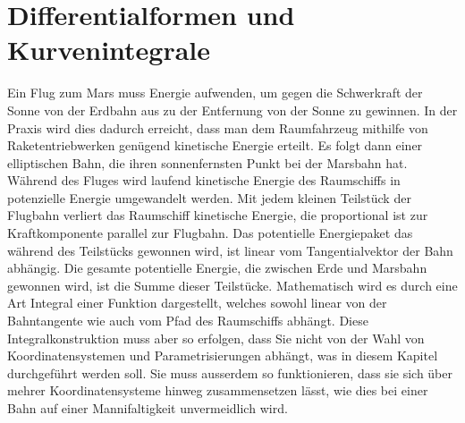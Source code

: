 %
%
%
\chapter{Differentialformen und Kurvenintegrale
\label{chapter:kurvenintegral}}
Ein Flug zum Mars muss Energie aufwenden, um gegen die Schwerkraft der
Sonne von der Erdbahn aus zu der 
Entfernung von der Sonne zu gewinnen.
In der Praxis wird dies dadurch erreicht, dass man dem Raumfahrzeug
mithilfe von Raketentriebwerken genügend kinetische Energie erteilt.
Es folgt dann einer elliptischen Bahn, die ihren sonnenfernsten Punkt
bei der Marsbahn hat.
Während des Fluges wird laufend kinetische Energie des Raumschiffs in
potenzielle Energie umgewandelt werden.
Mit jedem kleinen Teilstück der Flugbahn verliert das Raumschiff 
kinetische Energie, die proportional ist zur Kraftkomponente parallel
zur Flugbahn. 
Das potentielle Energiepaket das während des Teilstücks gewonnen wird,
ist linear vom Tangentialvektor der Bahn abhängig.
Die gesamte potentielle Energie, die zwischen Erde und Marsbahn
gewonnen wird, ist die Summe dieser Teilstücke.
Mathematisch wird es durch eine Art Integral einer Funktion dargestellt,
welches sowohl linear von der Bahntangente wie auch vom Pfad des
Raumschiffs abhängt.
Diese Integralkonstruktion muss aber so erfolgen, dass Sie nicht von der
Wahl von Koordinatensystemen und Parametrisierungen abhängt, was in
diesem Kapitel durchgeführt werden soll.
Sie muss ausserdem so funktionieren, dass sie sich über mehrer
Koordinatensysteme hinweg zusammensetzen lässt, wie dies bei einer
Bahn auf einer Mannifaltigkeit unvermeidlich wird.






